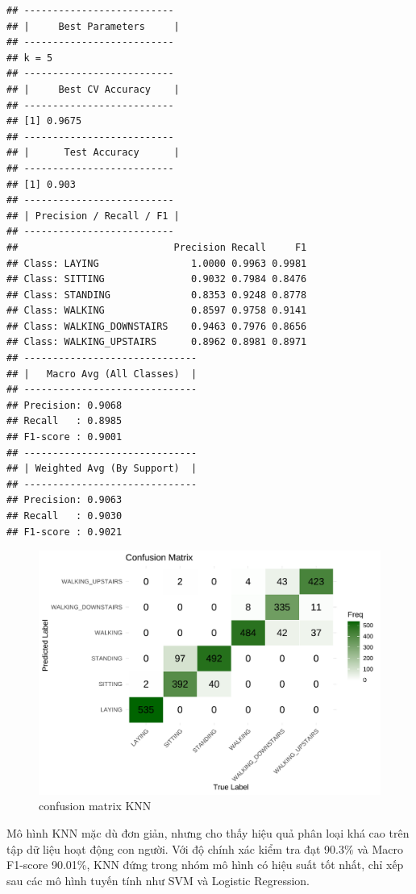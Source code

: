 \documentclass[
]{article}
\begin{document}
\begin{verbatim}
## --------------------------
## |     Best Parameters     |
## --------------------------
## k = 5
## --------------------------
## |     Best CV Accuracy    |
## --------------------------
## [1] 0.9675
## --------------------------
## |      Test Accuracy      |
## --------------------------
## [1] 0.903
## --------------------------
## | Precision / Recall / F1 |
## --------------------------
##                           Precision Recall     F1
## Class: LAYING                1.0000 0.9963 0.9981
## Class: SITTING               0.9032 0.7984 0.8476
## Class: STANDING              0.8353 0.9248 0.8778
## Class: WALKING               0.8597 0.9758 0.9141
## Class: WALKING_DOWNSTAIRS    0.9463 0.7976 0.8656
## Class: WALKING_UPSTAIRS      0.8962 0.8981 0.8971
## ------------------------------
## |   Macro Avg (All Classes)  |
## ------------------------------
## Precision: 0.9068
## Recall   : 0.8985
## F1-score : 0.9001
## ------------------------------
## | Weighted Avg (By Support)  |
## ------------------------------
## Precision: 0.9063
## Recall   : 0.9030
## F1-score : 0.9021
\end{verbatim}

\begin{figure}
\centering
\includegraphics{report_files/figure-latex/unnamed-chunk-27-1.pdf}
\caption{confusion matrix KNN}
\end{figure}

Mô hình KNN mặc dù đơn giản, nhưng cho thấy hiệu quả phân loại khá cao
trên tập dữ liệu hoạt động con người. Với độ chính xác kiểm tra đạt
90.3\% và Macro F1-score 90.01\%, KNN đứng trong nhóm mô hình có hiệu
suất tốt nhất, chỉ xếp sau các mô hình tuyến tính như SVM và Logistic
Regression.
\end{document}
